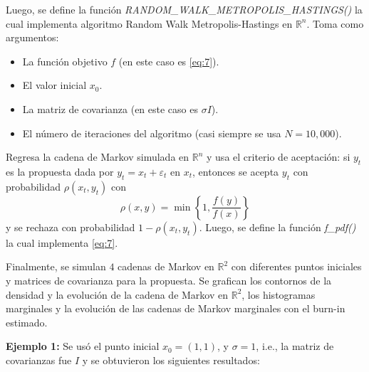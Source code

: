 Luego, se define la función \textit{RANDOM\_WALK\_METROPOLIS\_HASTINGS()} la cual implementa algoritmo Random Walk Metropolis-Hastings en $\mathbb{R}^n$. Toma como argumentos:
\begin{itemize}
	\item La función objetivo $f$ (en este caso es \eqref{eq:7}).
	\item El valor inicial $x_0$.
	\item La matriz de covarianza (en este caso es $\sigma I$).
	\item El número de iteraciones del algoritmo (casi siempre se usa $N = 10,000$).
\end{itemize}

Regresa la cadena de Markov simulada en $\mathbb{R}^n$ y usa el criterio de aceptación: si $y_t$ es la propuesta dada por $y_t = x_t + \varepsilon_t$ en $x_t$, entonces se acepta $y_t$ con probabilidad $\rho(x_t, y_t)$ con
\begin{equation}
	\rho(x,y) = \min\left\{1, \frac{f(y)}{f(x)} \right\}
\end{equation}
y se rechaza con probabilidad $1-\rho(x_t, y_t)$. Luego, se define la función \textit{f\_pdf()} la cual implementa \eqref{eq:7}.

Finalmente, se simulan $4$ cadenas de Markov en $\mathbb{R}^2$ con diferentes puntos iniciales y matrices de covarianza para la propuesta. Se grafican los contornos de la densidad y la evolución de la cadena de Markov en $\mathbb{R}^2$, los histogramas marginales y la evolución de las cadenas de Markov
marginales con el burn-in estimado.

\textbf{Ejemplo 1:} Se usó el punto inicial $x_0=(1,1)$, y $\sigma = 1$, i.e., la matriz de covarianzas fue $I$ y se obtuvieron los siguientes resultados:

